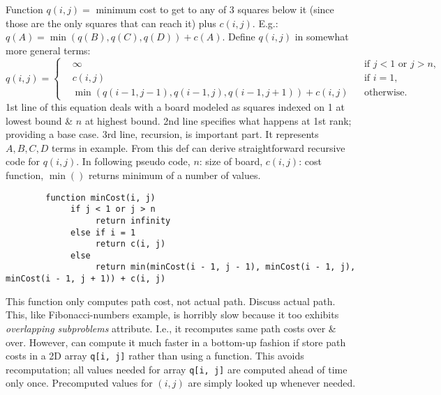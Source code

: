 \documentclass{article}
\begin{document}
\begin{enumerate}
	Function $q(i,j) =$ minimum cost to get to any of 3 squares below it (since those are the only squares that can reach it) plus $c(i,j)$. E.g.: $q(A) = \min(q(B),q(C),q(D)) + c(A)$. Define $q(i,j)$ in somewhat more general terms:
	\begin{equation*}
		q(i,j) = \left\{\begin{split}
			&\infty&&\mbox{if } j < 1\mbox{ or } j > n,\\
			&c(i,j)&&\mbox{if } i = 1,\\
			&\min(q(i - 1,j - 1),q(i - 1,j),q(i - 1,j + 1)) + c(i,j)&&\mbox{otherwise}.
		\end{split}\right.
	\end{equation*}
	1st line of this equation deals with a board modeled as squares indexed on 1 at lowest bound \& $n$ at highest bound. 2nd line specifies what happens at 1st rank; providing a base case. 3rd line, recursion, is important part. It represents $A,B,C,D$ terms in example. From this def can derive straightforward recursive code for $q(i,j)$. In following pseudo code, $n$: size of board, $c(i,j)$: cost function, $\min()$ returns minimum of a number of values.
	\begin{verbatim}
		function minCost(i, j)
		     if j < 1 or j > n
		          return infinity
		     else if i = 1
		          return c(i, j)
		     else
		          return min(minCost(i - 1, j - 1), minCost(i - 1, j), minCost(i - 1, j + 1)) + c(i, j)
	\end{verbatim}
	This function only computes path cost, not actual path. Discuss actual path. This, like Fibonacci-numbers example, is horribly slow because it too exhibits {\it overlapping subproblems} attribute. I.e., it recomputes same path costs over \& over. However, can compute it much faster in a bottom-up fashion if store path costs in a 2D array {\tt q[i, j]} rather than using a function. This avoids recomputation; all values needed for array {\tt q[i, j]} are computed ahead of time only once. Precomputed values for $(i,j)$ are simply looked up whenever needed.


\end{enumerate}
\end{document}
